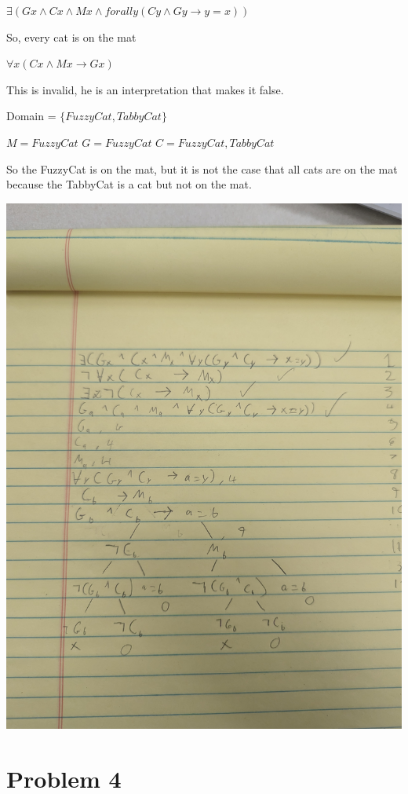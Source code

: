 \documentclass[12pt]{article}
\begin{document}
$\exists (Gx \land Cx \land Mx \land forall y (Cy \land Gy \rightarrow y = x))$

So, every cat is on the mat

$\forall x (Cx \land Mx \rightarrow Gx)$

This is invalid, he is an interpretation that makes it false. 

Domain = $\{FuzzyCat, TabbyCat\}$

$M = {FuzzyCat}$
$G = {FuzzyCat}$
$C = {FuzzyCat, TabbyCat}$

So the FuzzyCat is on the mat, but it is not the case that all cats are on the mat because the TabbyCat is a cat but not on the mat. 

\includegraphics[width=\textwidth]{3b}

\section*{Problem 4}
\end{document}
